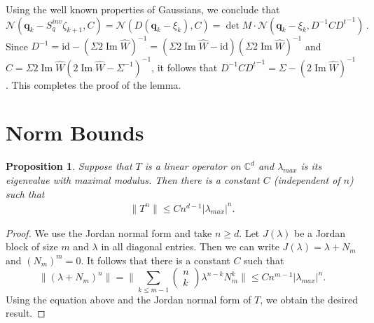 \documentclass[11pt]{article}
\newtheorem{proposition}[theorem]{Proposition}
\renewcommand{\Im}{\operatorname{Im}}
\newcommand{\id}{\mathrm{id}}
\begin{document}
	Using the well known properties of Gaussians, we conclude that
	$$\mathcal N(\mathbf{q}_k - S^{inv}_q\zeta_{k+1},C)=\mathcal N(D(\mathbf{q}_k - \xi_{k}),C)=\det M 
	\cdot \mathcal N(\mathbf{q}_k - \xi_{k},D^{-1}C{D^t}^{-1})\,.$$
	Since $D^{-1}=\id-(\Sigma2\Im\widehat W)^{-1}=(\Sigma2\Im\widehat W-\id)(\Sigma2\Im\widehat W)^{-1}$ and $C=\Sigma2\Im\widehat W(2\Im\widehat W -\Sigma^{-1})^{-1}$, it follows that
 $ D^{-1}C{D^t}^{-1}=\Sigma-(2\Im \widehat W)^{-1}$. 	
This completes the proof of the lemma.

\section{Norm Bounds}\label{NB}

\begin{proposition}\label{prop:NB}
Suppose that $T$ is a linear operator on $ \mathbb{C}^{d} $  and $\lambda_{max} $ is its eigenvalue with maximal modulus.  Then there is a constant $C$ (independent of $n$) such that 
\begin{align}
\|  T^n \| \leq C n^{d-1}  |\lambda_{max}  |^n. 
\end{align}
\end{proposition}

\begin{proof} We use the Jordan normal form and take $n \geq d$. 
 Let  $  J(\lambda ) $ be a Jordan block of size $m$ and $\lambda$ in all diagonal entries. Then we can write  
 $J (\lambda) =   \lambda +   N_m  $ and $(N_m)^{m} = 0$.   It follows that there is a constant $C$ such that
$$
\|  (\lambda +   N_m)^n\| =  \Big  \| \sum_{k  \leq m-1 }  \begin{pmatrix}
  n \\ k    
  \end{pmatrix}   \lambda^{n-k} N_m^{ k } \Big \|  \leq C  n^{m-1} |\lambda_{max}  |^n. 
$$ 
Using the equation above and the Jordan normal form of $T$, we obtain the desired result. 
\end{proof}

	
\end{document}
